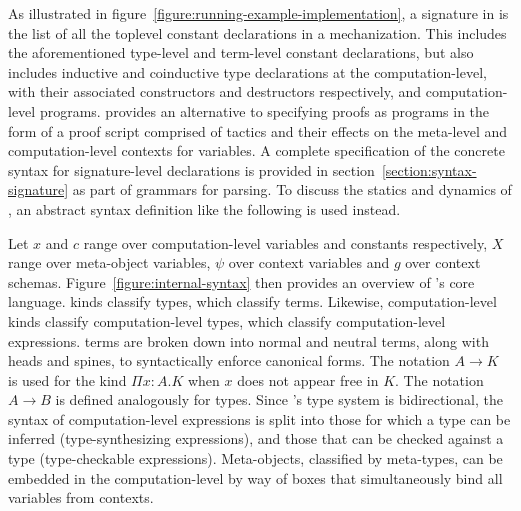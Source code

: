 \clearpage

As illustrated in figure~\ref{figure:running-example-implementation}, a signature in \Beluga is the list of all the toplevel constant declarations in a mechanization.
This includes the aforementioned \LF type-level and term-level constant declarations, but also includes inductive and coinductive type declarations at the computation-level, with their associated constructors and destructors respectively, and computation-level programs.
\Harpoon provides an alternative to specifying proofs as programs in the form of a proof script comprised of tactics and their effects on the meta-level and computation-level contexts for variables.
A complete specification of the concrete syntax for signature-level declarations is provided in section~\ref{section:syntax-signature} as part of grammars for parsing.
To discuss the statics and dynamics of \Beluga, an abstract syntax definition like the following is used instead.

Let $x$ and $c$ range over computation-level variables and constants respectively, $X$ range over meta-object variables, $\psi$ over context variables and $g$ over context schemas.
Figure~\ref{figure:internal-syntax} then provides an overview of \Beluga's core language.
\LF kinds classify \LF types, which classify \LF terms.
Likewise, computation-level kinds classify computation-level types, which classify computation-level expressions.
\LF terms are broken down into normal and neutral terms, along with heads and spines, to syntactically enforce canonical forms.
The notation $A \to K$ is used for the \LF kind $\Pi x{:}A. K$ when $x$ does not appear free in $K$.
The notation $A \to B$ is defined analogously for \LF types.
Since \Beluga's type system is bidirectional, the syntax of computation-level expressions is split into those for which a type can be inferred (type-synthesizing expressions), and those that can be checked against a type (type-checkable expressions).
Meta-objects, classified by meta-types, can be embedded in the computation-level by way of boxes that simultaneously bind all variables from \LF contexts.

